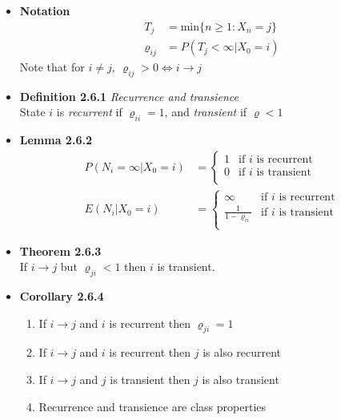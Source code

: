 \documentclass[11pt,a4paper]{article}
\begin{document}
\begin{itemize}

    \item \textbf{Notation} \\
        \begin{align*}{}
            T_j &= \text{min}\{n \geq 1 : X_n = j\} \\
            \varrho_{ij} &= P(T_j < \infty | X_0 = i)
        \end{align*}
        Note that for $i \neq j,\ \varrho_{ij} > 0 \iff i \rightarrow j$

    \item \textbf{Definition 2.6.1} \emph{Recurrence and transience} \\
        State $i$ is \emph{recurrent} if $\varrho_{ii} = 1$, and \emph{transient} if $\varrho < 1$

    \item \textbf{Lemma 2.6.2}
        \begin{align*}{}
            P(N_i = \infty | X_0 = i) &=
            \begin{cases}{}
                1 & \text{if $i$ is recurrent} \\
                0 & \text{if $i$ is transient} \\
            \end{cases} \\
            E(N_i | X_0 = i) &=
            \begin{cases}{}
                \infty & \text{if $i$ is recurrent} \\
                \frac{1}{1 - \varrho_{ii}} & \text{if $i$ is transient} \\
            \end{cases}
        \end{align*}

    \item \textbf{Theorem 2.6.3} \\
        If $i \rightarrow j$ but $\varrho_{ji} < 1$ then $i$ is transient.

    \item \textbf{Corollary 2.6.4}
        \begin{enumerate}
            \item If $i \rightarrow j$ and $i$ is recurrent then $\varrho_{ji} = 1$
            \item If $i \rightarrow j$ and $i$ is recurrent then $j$ is also recurrent
            \item If $i \rightarrow j$ and $j$ is transient then $j$ is also transient
            \item Recurrence and transience are class properties
        \end{enumerate}


\end{itemize}
\end{document}

